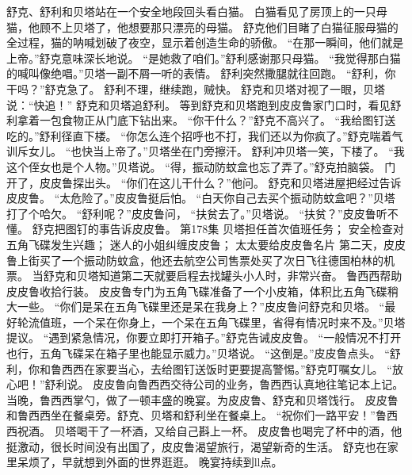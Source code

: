\documentclass[a4paper,12pt,UTF8,twoside]{ctexbook}
\begin{document}
        舒克、舒利和贝塔站在一个安全地段回头看白猫。 
        白猫看见了房顶上的一只母猫，他顾不上贝塔了，他想要那只漂亮的母猫。 
        舒克他们目睹了白猫征服母猫的全过程，猫的呐喊划破了夜空，显示着创造生命的骄傲。 
        “在那一瞬间，他们就是上帝。”舒克意味深长地说。 
        “是她救了咱们。”舒利感谢那只母猫。 
        “我觉得那白猫的喊叫像绝唱。”贝塔一副不屑一听的表情。 
        舒利突然撒腿就往回跑。 
        “舒利，你干吗？”舒克急了。 
        舒利不理，继续跑，贼快。 
        舒克和贝塔对视了一眼，贝塔说：“快追！” 
        舒克和贝塔追舒利。 
        等到舒克和贝塔跑到皮皮鲁家门口时，看见舒利拿着一包食物正从门底下钻出来。 
        “你干什么？”舒克不高兴了。 
        “我给图钉送吃的。”舒利径直下楼。 
        “你怎么连个招呼也不打，我们还以为你疯了。”舒克喘着气训斥女儿。 
        “也快当上帝了。”贝塔坐在门旁擦汗。 
        舒利冲贝塔一笑，下楼了。 
        “我这个侄女也是个人物。”贝塔说。 
        “得，振动防蚊盒也忘了弄了。”舒克拍脑袋。 
        门开了，皮皮鲁探出头。 
        “你们在这儿干什么？”他问。 
        舒克和贝塔进屋把经过告诉皮皮鲁。 
        “太危险了。”皮皮鲁挺后怕。 
        “白天你自己去买个振动防蚊盒吧？”贝塔打了个哈欠。 
        “舒利呢？”皮皮鲁问， 
        “扶贫去了。”贝塔说。 
        “扶贫？”皮皮鲁听不懂。 
        舒克把图钉的事告诉皮皮鲁。   第178集 
        贝塔担任首次值班任务； 
        安全检查对五角飞碟发生兴趣； 
        迷人的小姐纠缠皮皮鲁； 
        太太要给皮皮鲁名片   
        第二天，皮皮鲁上街买了一个振动防蚊盒，他还去航空公司售票处买了次日飞往德国柏林的机票。 
        当舒克和贝塔知道第二天就要启程去找罐头小人时，非常兴奋。 
        鲁西西帮助皮皮鲁收拾行装。 
        皮皮鲁专门为五角飞碟准备了一个小皮箱，体积比五角飞碟稍大一些。 
        “你们是呆在五角飞碟里还是呆在我身上？”皮皮鲁问舒克和贝塔。 
        “最好轮流值班，一个呆在你身上，一个呆在五角飞碟里，省得有情况时来不及。”贝塔提议。 
        “遇到紧急情况，你要立即打开箱子。”舒克告诫皮皮鲁。 
        “一般情况不打开也行，五角飞碟呆在箱子里也能显示威力。”贝塔说。 
        “这倒是。”皮皮鲁点头。 
        “舒利，你和鲁西西在家要当心，去给图钉送饭时更要提高警惕。”舒克叮嘱女儿。 
        “放心吧！”舒利说。 
        皮皮鲁向鲁西西交待公司的业务，鲁西西认真地往笔记本上记。 
        当晚，鲁西西掌勺，做了一顿丰盛的晚宴。为皮皮鲁、舒克和贝塔饯行。 
        皮皮鲁和鲁西西坐在餐桌旁。舒克、贝塔和舒利坐在餐桌上。 
        “祝你们一路平安！”鲁西西祝酒。 
        贝塔喝干了一杯酒，又给自己斟上一杯。 
        皮皮鲁也喝完了杯中的酒，他挺激动，很长时间没有出国了，皮皮鲁渴望旅行，渴望新奇的生活。 
        舒克也在家里呆烦了，早就想到外面的世界逛逛。 
        晚宴持续到ll点。 
\end{document}
